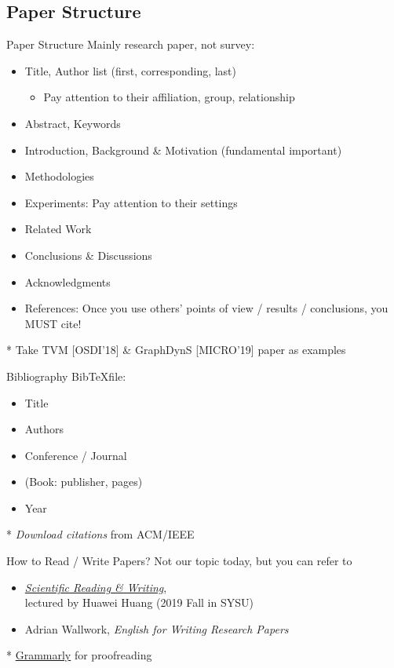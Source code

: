 \documentclass{../TexTemplate/myslide}
\begin{document}
\subsection{Paper Structure}
\begin{frame}{Paper Structure}
Mainly research paper, not survey:
\begin{itemize}
	\item Title, Author list (first, corresponding, last)
	\begin{itemize}
		\item Pay attention to their affiliation, group, relationship
	\end{itemize}
	\item Abstract, Keywords
	\item Introduction, Background \& Motivation (fundamental important)
	\item Methodologies
	\item Experiments: Pay attention to their settings
	\item Related Work
	\item Conclusions \& Discussions
	\item Acknowledgments
	\item References: Once you use others' points of view / results / conclusions, you MUST cite!
\end{itemize}
* Take TVM [OSDI'18] \& GraphDynS [MICRO'19] paper as examples
\end{frame}

\begin{frame}{Bibliography}
Bib\TeX file:
\begin{itemize}
	\item Title
	\item Authors
	\item Conference / Journal
	\item (Book: publisher, pages)
	\item Year
\end{itemize}
* \emph{Download citations} from ACM/IEEE
\end{frame}

\begin{frame}{How to Read / Write Papers?}
Not our topic today, but you can refer to
\begin{itemize}
	\item \href{http://inpluslab.com/paperwriting}{\emph{Scientific Reading \& Writing}},\\lectured by Huawei Huang (2019 Fall in SYSU)
	\item Adrian Wallwork, \emph{English for Writing Research Papers}
\end{itemize}
* \href{https://www.grammarly.com/}{Grammarly} for proofreading
\end{frame}
\end{document}
